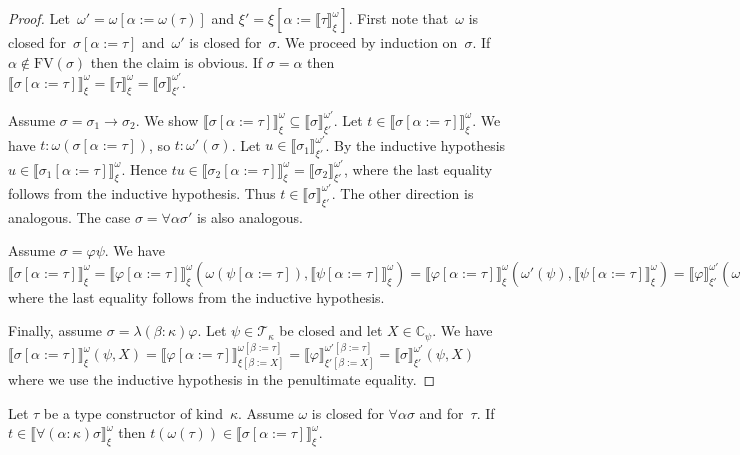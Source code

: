 \documentclass[a4paper,UKenglish,cleveref,autoref,numberwithinsect]{lipics-v2019}
\theoremstyle{definition}
\newcommand{\arrtype}{\rightarrow}
\newcommand{\subst}[2]{#1:=#2}
\newcommand{\FV}{\mathrm{FV}}
\newcommand{\Tc}{\mathcal{T}}
\newcommand{\Cb}{\mathbb{C}}
\newcommand{\val}[3]{\ensuremath{\llbracket#1\rrbracket_{#2}^{#3}}}
\begin{document}
\begin{proof}
  Let~$\omega' = \omega[\subst{\alpha}{\omega(\tau)}]$ and $\xi' =
  \xi[\subst{\alpha}{\val{\tau}{\xi}{\omega}}]$. First note
  that~$\omega$ is closed for~$\sigma[\subst{\alpha}{\tau}]$
  and~$\omega'$ is closed for~$\sigma$. We proceed by induction
  on~$\sigma$. If $\alpha \notin \FV(\sigma)$ then the claim is
  obvious. If $\sigma = \alpha$ then
  $\val{\sigma[\subst{\alpha}{\tau}]}{\xi}{\omega} =
  \val{\tau}{\xi}{\omega} = \val{\sigma}{\xi'}{\omega'}$.

  Assume $\sigma = \sigma_1\arrtype\sigma_2$. We show
  $\val{\sigma[\subst{\alpha}{\tau}]}{\xi}{\omega} \subseteq
  \val{\sigma}{\xi'}{\omega'}$. Let $t \in
  \val{\sigma[\subst{\alpha}{\tau}]}{\xi}{\omega}$. We have $t :
  \omega(\sigma[\subst{\alpha}{\tau}])$, so $t : \omega'(\sigma)$. Let
  $u \in \val{\sigma_1}{\xi'}{\omega'}$. By the inductive hypothesis
  $u \in \val{\sigma_1[\subst{\alpha}{\tau}]}{\xi}{\omega}$. Hence $t
  u \in \val{\sigma_2[\subst{\alpha}{\tau}]}{\xi}{\omega} =
  \val{\sigma_2}{\xi'}{\omega'}$, where the last equality follows from
  the inductive hypothesis. Thus $t \in
  \val{\sigma}{\xi'}{\omega'}$. The other direction is analogous. The
  case $\sigma = \forall\alpha\sigma'$ is also analogous.

  Assume $\sigma = \varphi\psi$. We have
  $\val{\sigma[\subst{\alpha}{\tau}]}{\xi}{\omega} =
  \val{\varphi[\subst{\alpha}{\tau}]}{\xi}{\omega}(\omega(\psi[\subst{\alpha}{\tau}]),
  \val{\psi[\subst{\alpha}{\tau}]}{\xi}{\omega}) =
  \val{\varphi[\subst{\alpha}{\tau}]}{\xi}{\omega}(\omega'(\psi),
  \val{\psi[\subst{\alpha}{\tau}]}{\xi}{\omega}) =
  \val{\varphi}{\xi'}{\omega'}(\omega'(\psi),
  \val{\psi}{\xi'}{\omega'})$ where the last equality follows from the
  inductive hypothesis.

  Finally, assume $\sigma = \lambda(\beta:\kappa)\varphi$. Let $\psi
  \in \Tc_\kappa$ be closed and let $X \in \Cb_\psi$. We have
  $\val{\sigma[\subst{\alpha}{\tau}]}{\xi}{\omega}(\psi,X) =
  \val{\varphi[\subst{\alpha}{\tau}]}{\xi[\subst{\beta}{X}]}{\omega[\subst{\beta}{\tau}]}
  =
  \val{\varphi}{\xi'[\subst{\beta}{X}]}{\omega'[\subst{\beta}{\tau}]}
  = \val{\sigma}{\xi'}{\omega'}(\psi,X)$ where we use the inductive
  hypothesis in the penultimate equality.
\end{proof}

\begin{lemma}\label{lem_forall}
  Let $\tau$ be a type constructor of kind~$\kappa$. Assume $\omega$
  is closed for $\forall\alpha\sigma$ and for~$\tau$. If $t \in
  \val{\forall(\alpha:\kappa)\sigma}{\xi}{\omega}$ then $t
  (\omega(\tau)) \in \val{\sigma[\subst{\alpha}{\tau}]}{\xi}{\omega}$.
\end{lemma}
\end{document}
